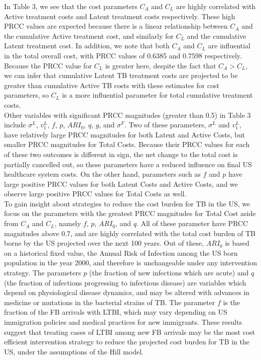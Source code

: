 \documentclass{article}[11pt]
\begin{document}
In Table 3, we see that the cost parameters $C_{A}$ and $C_{L}$ are highly correlated with Active treatment costs and Latent treatment costs respectively.  These high PRCC values are expected because there is a linear relationship between $C_{A}$ and the cumulative Active treatment cost, and similarly for $C_{L}$ and the cumulative Latent treatment cost.  In addition, we note that both $C_{A}$ and $C_{L}$ are influential in the total overall cost, with PRCC values of 0.6385 and 0.7598 respectively.  Because the PRCC value for $C_{L}$ is greater here, despite the fact that $C_{A} > C_{L}$, we can infer that cumulative Latent TB treatment costs are projected to be greater than cumulative Active TB costs with these estimates for cost parameters, so $C_{L}$ is a more influential parameter for total cumulative treatment costs.  \\

Other variables with significant PRCC magnitudes (greater than 0.5) in Table 3 include $\sigma^{L}$, $v^{L}_{1}$, $f$, $p$, $ARI_{0}$, $q$, $g$, and $\sigma^{F}$.  Two of these parameters, $\sigma^{L}$ and $v^{L}_{1}$, have relatively large PRCC magnitudes for both Latent and Active Costs, but smaller PRCC magnitudes for Total Costs.  Because their PRCC values for each of these two outcomes is different in sign, the net change to the total cost is partially cancelled out, so these parameters have a reduced influence on final US healthcare system costs.  On the other hand, parameters such as $f$ and $p$ have large positive PRCC values for both Latent Costs and Active Costs, and we observe large positive PRCC values for Total Costs as well.\\

To gain insight about strategies to reduce the cost burden for TB in the US, we focus on the parameters with the greatest PRCC magnitudes for Total Cost aside from $C_{A}$ and $C_{L}$, namely $f$, $p$, $ARI_{0}$, and $q$.  All of these parameter have PRCC magnitudes above 0.7, and are highly correlated with the total cost burden of TB borne by the US projected over the next 100 years.  Out of these, $ARI_{0}$ is based on a historical fixed value, the Annual Risk of Infection among the US born population in the year 2000, and therefore is unchangeable under any intervention strategy.  The parameters $p$ (the fraction of new infections which are acute) and $q$ (the fraction of infections progressing to infectious disease) are variables which depend on physiological disease dynamics, and may be altered with advances in medicine or mutations in the bacterial strains of TB.  The parameter $f$ is the fraction of the FB arrivals with LTBI, which may vary depending on US immigration policies and medical practices for new immigrants.  These results suggest that treating cases of LTBI among new FB arrivals may be the most cost efficient intervention strategy to reduce the projected cost burden for TB in the US, under the assumptions of the Hill model.  \\
\end{document}
